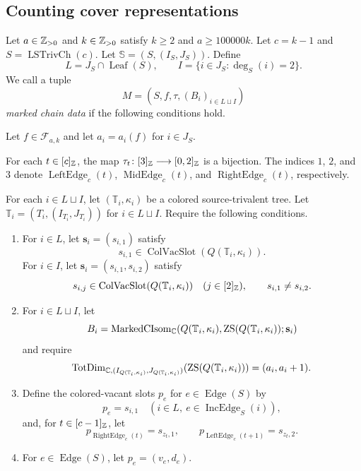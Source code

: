 \subsection{Counting cover representations}
\begin{definition}\label{def:marked-chain-data}
Let $a\in\mathbb Z_{>0}$ and $k\in\mathbb Z_{>0}$ satisfy $k\ge2$ and $a\ge100000k$.
Let $c=k-1$ and $S=\operatorname{LSTrivCh}(c)$.
Let $\mathbb S=(S,(I_S,J_S))$.
Define
\[
 L=J_{S}\cap\operatorname{Leaf}(S),\qquad
 I=\{i\in J_{S}:\deg_S(i)=2\}.
\]
We call a tuple
\[
 M=(S,f,\tau,(B_i)_{i\in L\sqcup I})
\]
\textit{marked chain data} if the following conditions hold.
\begin{hypotheses}
\item\label{hyp:marked-flows} Let $f\in\mathcal F_{a,k}$ and let $a_i=a_i(f)$ for $i\in J_S$.
\item\label{hyp:marked-colors} For each $t\in[c]_{\mathbb Z}$, the map
$\tau_t\colon[3]_{\mathbb Z}\longrightarrow[0,2]_{\mathbb Z}$ is a bijection.
The indices $1$, $2$, and $3$ denote $\operatorname{LeftEdge}_c(t)$,
$\operatorname{MidEdge}_c(t)$, and $\operatorname{RightEdge}_c(t)$, respectively.
\item\label{hyp:marked-blocks} For each $i\in L\sqcup I$, let $(\mathbb T_i,\kappa_i)$ be a colored source-trivalent tree.
Let $\mathbb T_i=(T_i,(I_{T_i},J_{T_i}))$ for $i\in L\sqcup I$.
Require the following conditions.
\begin{enumerate}[label=(\roman*),font=\itshape]
\item For $i\in L$, let $\mathbf s_i=(s_{i,1})$ satisfy
\[
 s_{i,1}\in\operatorname{ColVacSlot}(Q(\mathbb T_i,\kappa_i)).
\]
For $i\in I$, let $\mathbf s_i=(s_{i,1},s_{i,2})$ satisfy
\[
 s_{i,j}\in\operatorname{ColVacSlot}(Q(\mathbb T_i,\kappa_i))\quad(j\in[2]_{\mathbb Z}),
 \qquad s_{i,1}\ne s_{i,2}.
\]
\item For $i\in L\sqcup I$, let
\[
 B_i=\operatorname{MarkedCIsom}_{\mathbb C}(Q(\mathbb T_i,\kappa_i),\operatorname{ZS}(Q(\mathbb T_i,\kappa_i));\mathbf s_i)
\]
and require
\[
 \operatorname{TotDim}_{\mathbb C,(I_{Q(\mathbb T_i,\kappa_i)},J_{Q(\mathbb T_i,\kappa_i)})}
 (\operatorname{ZS}(Q(\mathbb T_i,\kappa_i)))=(a_i,a_i+1).
\]
\item Define the colored-vacant slots $p_e$ for $e\in\operatorname{Edge}(S)$ by
\[
 p_e=s_{i,1}\quad(i\in L,\ e\in\operatorname{IncEdge}_S(i)),
\]
and, for $t\in[c-1]_{\mathbb Z}$, let
\[
 p_{\operatorname{RightEdge}_c(t)}=s_{z_t,1},\qquad
 p_{\operatorname{LeftEdge}_c(t+1)}=s_{z_t,2}.
\]
\item For $e\in\operatorname{Edge}(S)$, let $p_e=(v_e,d_e)$.

\end{enumerate}
\end{hypotheses}
\end{definition}
